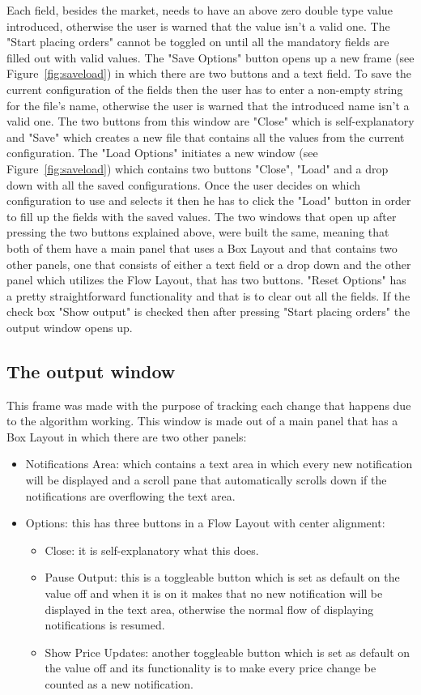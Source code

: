 \documentclass[12pt,a4paper]{report}
\begin{document}
Each field, besides the market, needs to have an above zero double type value introduced, otherwise the user is warned that the value isn't a valid one. The "Start placing orders" cannot be toggled on until all the mandatory fields are filled out with valid values. The "Save Options" button opens up a new frame (see Figure~\ref{fig:saveload}) in which there are two buttons and a text field. To save the current configuration of the fields then the user has to enter a non-empty string for the file's name, otherwise the user is warned that the introduced name isn't a valid one. The two buttons from this window are "Close" which is self-explanatory and "Save" which creates a new file that contains all the values from the current configuration. The "Load Options" initiates a new window (see Figure~\ref{fig:saveload}) which contains two buttons "Close", "Load" and a drop down with all the saved configurations. Once the user decides on which configuration to use and selects it then he has to click the "Load" button in order to fill up the fields with the saved values. The two windows that open up after pressing the two buttons explained above, were built the same, meaning that both of them have a main panel that uses a Box Layout and that contains two other panels, one that consists of either a text field or a drop down and the other panel which utilizes the Flow Layout, that has two buttons. "Reset Options" has a pretty straightforward functionality and that is to clear out all the fields. If the check box "Show output" is checked then after pressing "Start placing orders" the output window opens up.

\subsection{The output window}
This frame was made with the purpose of tracking each change that happens due to the algorithm working. This window is made out of a main panel that has a Box Layout in which there are two other panels:
\begin{itemize}
	\item Notifications Area: which contains a text area in which every new notification will be displayed and a scroll pane that automatically scrolls down if the notifications are overflowing the text area.
	\item Options: this has three buttons in a Flow Layout with center alignment:
	\begin{itemize}
		\item Close: it is self-explanatory what this does.
		\item Pause Output: this is a toggleable button which is set as default on the value off and when it is on it makes that no new notification will be displayed in the text area, otherwise the normal flow of displaying notifications is resumed.
		\item Show Price Updates: another toggleable button which is set as default on the value off and its functionality is to make every price change be counted as a new notification.
	\end{itemize}
\end{itemize}
\end{document}

